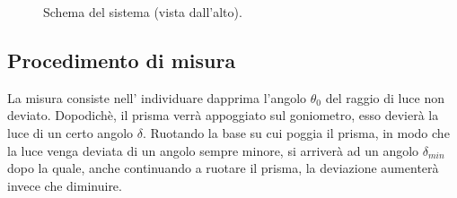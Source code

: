 \documentclass[10pt,twocolumn]{article}
\begin{document}
\begin{figure}[H]
{
    }
    \caption{Schema del sistema (vista dall'alto).}
    \end{figure}
    \subsection{Procedimento di misura}
    \noindent La misura consiste nell' individuare dapprima l'angolo $\theta_0$ del raggio di luce non deviato. Dopodichè, il prisma verrà appoggiato sul goniometro, esso 
    devierà la luce di un certo angolo $\delta$. Ruotando la base su cui poggia il prisma, in modo che la luce venga deviata di un angolo sempre minore, si
    arriverà ad un angolo $\delta_{min}$ dopo la quale, anche continuando a ruotare il prisma, la deviazione aumenterà invece che diminuire.
\end{document}
